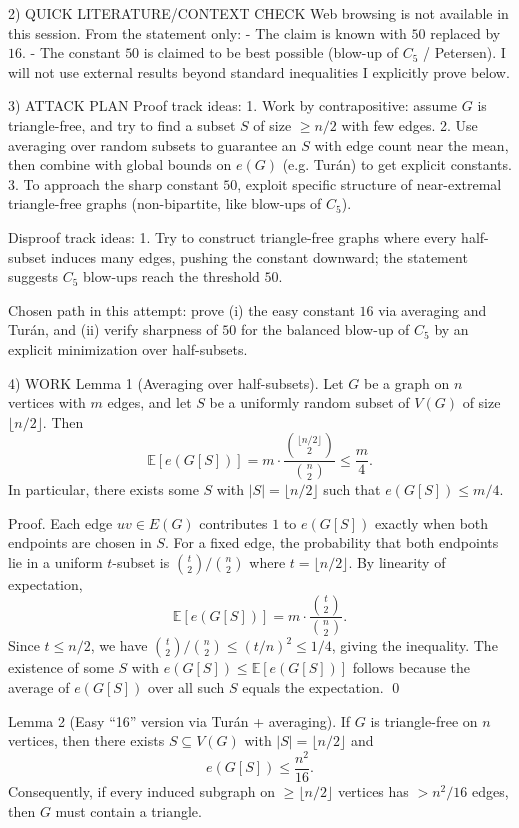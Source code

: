 2) QUICK LITERATURE/CONTEXT CHECK
Web browsing is not available in this session.
From the statement only:
- The claim is known with $50$ replaced by $16$.
- The constant $50$ is claimed to be best possible (blow-up of $C_5$ / Petersen).
I will not use external results beyond standard inequalities I explicitly prove below.

3) ATTACK PLAN
Proof track ideas:
1. Work by contrapositive: assume $G$ is triangle-free, and try to find a subset $S$ of size $\ge n/2$ with few edges.
2. Use averaging over random subsets to guarantee an $S$ with edge count near the mean, then combine with global bounds on $e(G)$ (e.g. Tur\'an) to get explicit constants.
3. To approach the sharp constant $50$, exploit specific structure of near-extremal triangle-free graphs (non-bipartite, like blow-ups of $C_5$).

Disproof track ideas:
1. Try to construct triangle-free graphs where every half-subset induces many edges, pushing the constant downward; the statement suggests $C_5$ blow-ups reach the threshold $50$.

Chosen path in this attempt: prove (i) the easy constant $16$ via averaging and Tur\'an, and (ii) verify sharpness of $50$ for the balanced blow-up of $C_5$ by an explicit minimization over half-subsets.

4) WORK
Lemma 1 (Averaging over half-subsets).
Let $G$ be a graph on $n$ vertices with $m$ edges, and let $S$ be a uniformly random subset of $V(G)$ of size $\lfloor n/2\rfloor$.
Then
\[\mathbb E[e(G[S])] = m\cdot \frac{\binom{\lfloor n/2\rfloor}{2}}{\binom{n}{2}} \le \frac{m}{4}.\]
In particular, there exists some $S$ with $|S|=\lfloor n/2\rfloor$ such that $e(G[S])\le m/4$.

Proof.
Each edge $uv\in E(G)$ contributes $1$ to $e(G[S])$ exactly when both endpoints are chosen in $S$.
For a fixed edge, the probability that both endpoints lie in a uniform $t$-subset is $\binom{t}{2}/\binom{n}{2}$ where $t=\lfloor n/2\rfloor$.
By linearity of expectation,
\[\mathbb E[e(G[S])] = m\cdot \frac{\binom{t}{2}}{\binom{n}{2}}.\]
Since $t\le n/2$, we have $\binom{t}{2}/\binom{n}{2}\le (t/n)^2\le 1/4$, giving the inequality.
The existence of some $S$ with $e(G[S])\le \mathbb E[e(G[S])]$ follows because the average of $e(G[S])$ over all such $S$ equals the expectation. \qed

Lemma 2 (Easy ``16'' version via Tur\'an + averaging).
If $G$ is triangle-free on $n$ vertices, then there exists $S\subseteq V(G)$ with $|S|=\lfloor n/2\rfloor$ and
\[e(G[S])\le \frac{n^2}{16}.\]
Consequently, if every induced subgraph on $\ge \lfloor n/2\rfloor$ vertices has $>n^2/16$ edges, then $G$ must contain a triangle.

